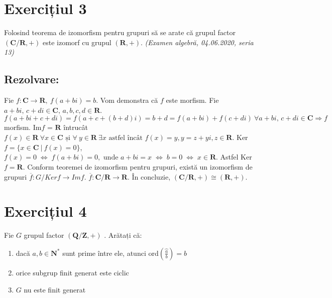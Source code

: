 \documentclass{article}
\DeclareRobustCommand\iff{\;\Longleftrightarrow\;}
\begin{document}
\section{Exercițiul 3}
Folosind teorema de izomorfism pentru grupuri să se arate că grupul factor $(\mathbf{C}/\mathbf{R},+)$ este izomorf cu grupul $(\mathbf{R},+)$.
\newline \newline
\emph{(Examen algebră, 04.06.2020, seria 13)}

\subsection{Rezolvare:}

Fie $f:\mathbf{C}\rightarrow\mathbf{R}, \ f(a + bi) = b$. Vom demonstra că $f$ este morfism. Fie $a+bi, \, c+di \in \mathbf{C}, \, a, b, c, d \in \mathbf{R}$.
\newline
$f(a+bi+c+di) = f(a+c+(b+d)i)= b + d = f(a+bi) + f(c+di) \ \forall a+bi, \, c+di \in \mathbf{C} \Rightarrow f$ morfism. 
\newline
Im$f$ = $\mathbf{R}$ întrucât $f(x) \in \mathbf{R} \ \forall x \in \mathbf{C} \text{ și } \forall \ y \in \mathbf{R} \ \exists x \text{ astfel încât } f(x)=y, y = z + yi, z \in \mathbf{R}$.
\newline
Ker $f = \{ x \in \mathbf{C} \ |\ f(x) = 0 \}$, $f(x) = 0 \iff f(a+bi) = 0, \text{ unde }a+bi = x \iff b = 0 \iff x \in \mathbf{R}$. Astfel Ker $f = \mathbf{R}$.
\newline Conform teoremei de izomorfism pentru grupuri, există un izomorfism de grupuri $\overline{f}:G/Kerf \rightarrow Im f$. $\overline{f}:\mathbf{C}/\mathbf{R} \rightarrow \mathbf{R}$. În concluzie, $(\mathbf{C}/\mathbf{R},+) \cong (\mathbf{R},+)$.


\section{Exercițiul 4}
Fie $G$ grupul factor $(\mathbf{Q}/\mathbf{Z}, +)$ . Arătați că:

\begin{enumerate}
    \item dacă $a, b \in \mathbf{N}^*$ sunt prime între ele, atunci ord$\left(\widehat{\frac{a}{b}}\right) = b$
    \item orice subgrup finit generat este ciclic
    \item $G$ nu este finit generat
\end{enumerate}
\end{document}
